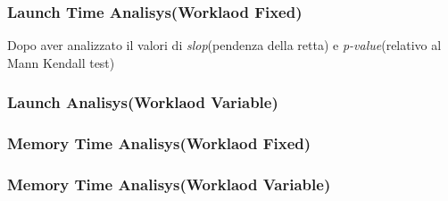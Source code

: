 \subsubsection{Launch Time Analisys(Worklaod Fixed)}
Dopo aver analizzato il valori di \textit{slop}(pendenza della retta) e
\textit{p-value}(relativo al Mann Kendall test) 
\subsubsection{Launch Analisys(Worklaod Variable)}

\subsubsection{Memory Time Analisys(Worklaod Fixed)}

\subsubsection{Memory Time Analisys(Worklaod Variable)}
